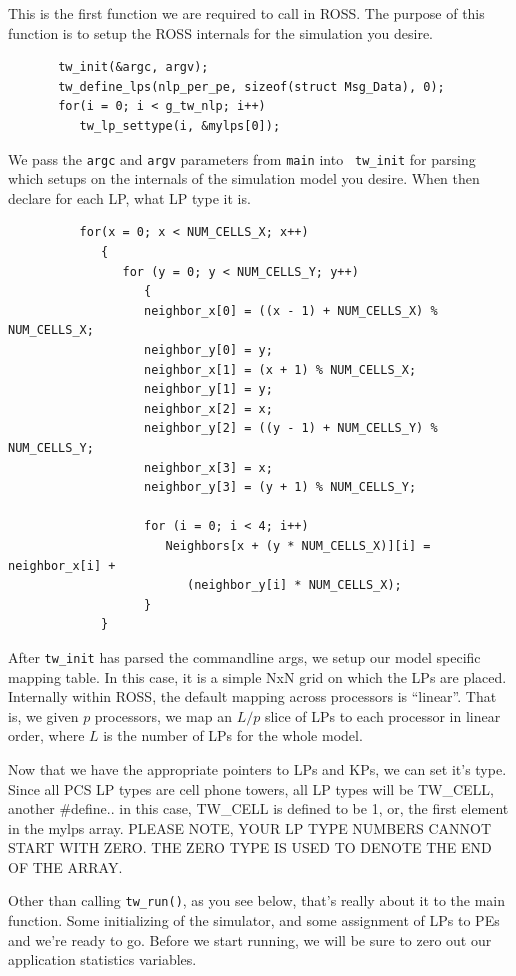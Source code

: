 \documentclass[12pt]{article}
\begin{document}
This is the first function we are required to call in ROSS.  The
purpose of this function is to setup the ROSS internals for the
simulation you desire.  

\begin{verbatim}
       tw_init(&argc, argv);
       tw_define_lps(nlp_per_pe, sizeof(struct Msg_Data), 0);
       for(i = 0; i < g_tw_nlp; i++)
          tw_lp_settype(i, &mylps[0]);
\end{verbatim}
 
We pass the {\tt argc} and {\tt argv} parameters from {\tt main} into {\tt
  tw\_init} for parsing which setups on the internals of the simulation model
you desire. When then declare for each LP, what LP type it is.

\begin{verbatim}
          for(x = 0; x < NUM_CELLS_X; x++)
             {
                for (y = 0; y < NUM_CELLS_Y; y++)
                   {
                   neighbor_x[0] = ((x - 1) + NUM_CELLS_X) % NUM_CELLS_X;
                   neighbor_y[0] = y;
                   neighbor_x[1] = (x + 1) % NUM_CELLS_X;
                   neighbor_y[1] = y;
                   neighbor_x[2] = x;
                   neighbor_y[2] = ((y - 1) + NUM_CELLS_Y) % NUM_CELLS_Y;
                   neighbor_x[3] = x;
                   neighbor_y[3] = (y + 1) % NUM_CELLS_Y;

                   for (i = 0; i < 4; i++)
                      Neighbors[x + (y * NUM_CELLS_X)][i] = neighbor_x[i] +
                         (neighbor_y[i] * NUM_CELLS_X);
                   }
             }
\end{verbatim}

After {\tt tw\_init} has parsed the commandline args, we setup our model
specific mapping table. In this case, it is a simple NxN grid on which the LPs
are placed. Internally within ROSS, the default mapping across processors is
``linear''. That is, we given $p$ processors, we map an $L/p$ slice of LPs to
each processor in linear order, where $L$ is the number of LPs for the whole
model.

Now that we have the appropriate pointers to LPs and KPs, we can set it's
type.  Since all PCS LP types are cell phone towers, all LP types will be
TW\_CELL, another \#define.. in this case, TW\_CELL is defined to be 1, or,
the first element in the mylps array. PLEASE NOTE, YOUR LP TYPE NUMBERS CANNOT
START WITH ZERO. THE ZERO TYPE IS USED TO DENOTE THE END OF THE ARRAY.

Other than calling {\tt tw\_run()}, as you see below, that's really about it
to the main function.  Some initializing of the simulator, and some assignment
of LPs to PEs and we're ready to go.  Before we start running, we will be sure
to zero out our application statistics variables.
\end{document}
